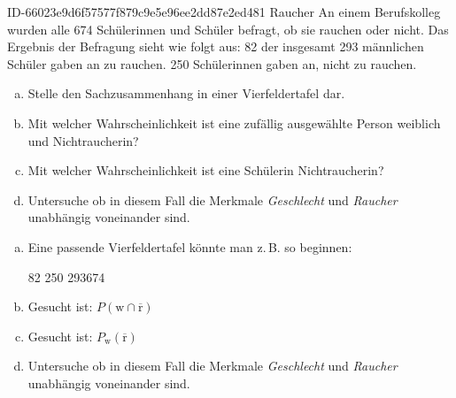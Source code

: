 \begin{exercise}
      {ID-66023e9d6f57577f879c9e5e96ee2dd87e2ed481}
      {Raucher}
  \ifproblem\problem
    An einem Berufskolleg wurden alle \num{674} Schülerinnen und Schüler
    befragt, ob sie rauchen oder nicht. Das Ergebnis der Befragung sieht
    wie folgt aus: \num{82} der insgesamt \num{293} männlichen Schüler
    gaben an zu rauchen. \num{250} Schülerinnen gaben an, nicht zu
    rauchen.
    \begin{enumerate}[a)]
      \item Stelle den Sachzusammenhang in einer Vierfeldertafel dar.
      \item Mit welcher Wahrscheinlichkeit ist eine zufällig ausgewählte
            Person weiblich und Nichtraucherin?
      \item Mit welcher Wahrscheinlichkeit ist eine Schülerin Nichtraucherin?
      \item Untersuche ob in diesem Fall die Merkmale \emph{Geschlecht}
            und \emph{Raucher} unabhängig voneinander sind.
    \end{enumerate}
  \fi
  \ifoutline\outline
    \begin{enumerate}[a)]
      \item Eine passende Vierfeldertafel könnte man z.\,B. so beginnen:
            \begin{center}
              \begin{fourfoldtable}
                \numbers
                {82}{}{}
                {}{250}{}
                {293}{}{674}
              \end{fourfoldtable}
            \end{center}
      \item Gesucht ist: $P(\text{w}\cap\overline{\text{r}})$
      \item Gesucht ist: $P_{\text{w}}(\overline{\text{r}})$
      \item Untersuche ob in diesem Fall die Merkmale \emph{Geschlecht}
            und \emph{Raucher} unabhängig voneinander sind.
    \end{enumerate}
  \fi
\end{exercise}

